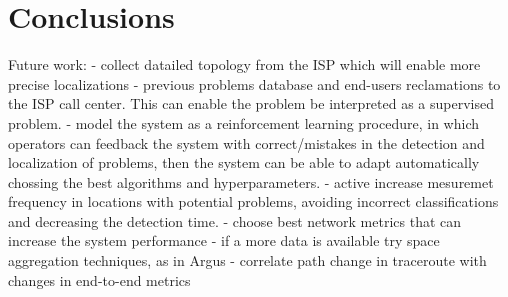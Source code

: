 \chapter{Conclusions}


Future work:
- collect datailed topology from the ISP which will enable more precise
localizations
- previous problems database and end-users reclamations to the ISP call center.
This can enable the problem be interpreted as a supervised problem.
- model the system as a reinforcement learning procedure, in which operators
can feedback the system with correct/mistakes in the detection and localization
of problems, then the system can be able to adapt automatically chossing the
best algorithms and hyperparameters.
- active increase mesuremet frequency in locations with potential problems,
avoiding incorrect classifications and decreasing the detection time.
- choose best network metrics that can increase the system performance
- if a more data is available try space aggregation techniques, as in Argus
- correlate path change in traceroute with changes in end-to-end metrics
